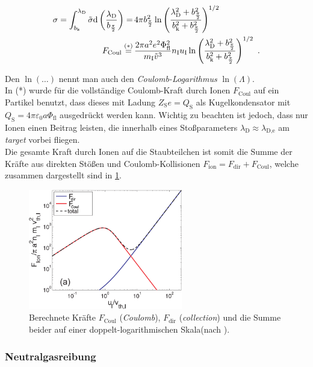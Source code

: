 \documentclass[numbers=noenddot,a4paper]{scrartcl}
\newcommand{\diff}{\textnormal{d}}
\newcommand{\ix}[1]{_\text{#1}}
\newcommand{\tilt}[1]{\textit{#1}}
\begin{document}
					\begin{align}
						\sigma=\int_{b\ix{k}}^{\lambda\ix{D}}\tilde{\sigma}\diff\left(\frac{\lambda\ix{D}}{b_{\frac{\pi}{2}}}\right)=&\,4\pi b_{\frac{\pi}{2}}^2\ln\left(\frac{\lambda\ix{D}^2+b_{\frac{\pi}{2}}^2}{b\ix{k}^2+b_{\frac{\pi}{2}}^2}\right)^{1/2} \nonumber \\
						F\ix{Coul}\overset{(*)}{=}&\,\frac{2\pi a^2 e^2\Phi\ix{fl}^2}{m\ix{I}\tilde{v}^3}n\ix{I}u\ix{I}\ln\left(\frac{\lambda\ix{D}^2+b_{\frac{\pi}{2}}^2}{b\ix{k}^2+b_{\frac{\pi}{2}}^2}\right)^{1/2} \, \, .
					\end{align}

				Den $\ln\left(\dots\right)$ nennt man auch den \tilt{Coulomb-Logarithmus} $\ln\left(\Lambda\right)$.\\
				In (*) wurde für die vollständige Coulomb-Kraft durch Ionen $F\ix{Coul}$ auf ein Partikel benutzt, dass dieses mit Ladung $Z\ix{S}e=Q\ix{S}$ als Kugelkondensator mit $Q\ix{S}=4\pi\varepsilon\ix{0}a\Phi\ix{fl}$ ausgedrückt werden kann. Wichtig zu beachten ist jedoch, dass nur Ionen einen Beitrag leisten, die innerhalb eines Stoßparameters $\lambda\ix{D}\approx\lambda\ix{D,e}$ am \tilt{target} vorbei fliegen.\\
				Die gesamte Kraft durch Ionen auf die Staubteilchen ist somit die Summe der Kräfte aus direkten Stößen und Coulomb-Kollisionen $F\ix{ion}=F\ix{dir}+F\ix{Coul}$, welche zusammen dargestellt sind in \ref{img:ionkräfte}.

					\begin{figure}
						\centering
						\includegraphics[height=0.4\textwidth,width=0.6\textwidth]{figs/forcesandtrappingmelzer.png}
						\caption{Berechnete Kräfte $F\ix{Coul}$ (\tilt{Coulomb}), $F\ix{dir}$ (\tilt{collection}) und die Summe beider auf einer doppelt-logarithmischen Skala(nach \cite{Melzer12}).}
						\label{img:ionkräfte}
					\end{figure}

		\subsubsection{Neutralgasreibung}
\end{document}
